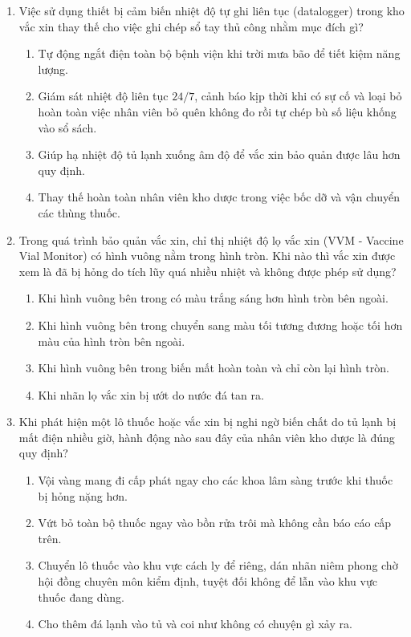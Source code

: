 \documentclass[12pt,a4paper]{article}
\begin{document}
\begin{enumerate}[label=\textbf{Câu \arabic*:}, leftmargin=*]
\item Việc sử dụng thiết bị cảm biến nhiệt độ tự ghi liên tục (datalogger) trong kho vắc xin thay thế cho việc ghi chép sổ tay thủ công nhằm mục đích gì?
\begin{enumerate}[label=\textbf{\Alph*.}]
    \item Tự động ngắt điện toàn bộ bệnh viện khi trời mưa bão để tiết kiệm năng lượng.
    \item Giám sát nhiệt độ liên tục $24/7$, cảnh báo kịp thời khi có sự cố và loại bỏ hoàn toàn việc nhân viên bỏ quên không đo rồi tự chép bù số liệu khống vào sổ sách.
    \item Giúp hạ nhiệt độ tủ lạnh xuống âm độ để vắc xin bảo quản được lâu hơn quy định.
    \item Thay thế hoàn toàn nhân viên kho dược trong việc bốc dỡ và vận chuyển các thùng thuốc.
\end{enumerate}

\item Trong quá trình bảo quản vắc xin, chỉ thị nhiệt độ lọ vắc xin (VVM - Vaccine Vial Monitor) có hình vuông nằm trong hình tròn. Khi nào thì vắc xin được xem là đã bị hỏng do tích lũy quá nhiều nhiệt và không được phép sử dụng?
\begin{enumerate}[label=\textbf{\Alph*.}]
    \item Khi hình vuông bên trong có màu trắng sáng hơn hình tròn bên ngoài.
    \item Khi hình vuông bên trong chuyển sang màu tối tương đương hoặc tối hơn màu của hình tròn bên ngoài.
    \item Khi hình vuông bên trong biến mất hoàn toàn và chỉ còn lại hình tròn.
    \item Khi nhãn lọ vắc xin bị ướt do nước đá tan ra.
\end{enumerate}

\item Khi phát hiện một lô thuốc hoặc vắc xin bị nghi ngờ biến chất do tủ lạnh bị mất điện nhiều giờ, hành động nào sau đây của nhân viên kho dược là đúng quy định?
\begin{enumerate}[label=\textbf{\Alph*.}]
    \item Vội vàng mang đi cấp phát ngay cho các khoa lâm sàng trước khi thuốc bị hỏng nặng hơn.
    \item Vứt bỏ toàn bộ thuốc ngay vào bồn rửa trôi mà không cần báo cáo cấp trên.
    \item Chuyển lô thuốc vào khu vực cách ly để riêng, dán nhãn niêm phong chờ hội đồng chuyên môn kiểm định, tuyệt đối không để lẫn vào khu vực thuốc đang dùng.
    \item Cho thêm đá lạnh vào tủ và coi như không có chuyện gì xảy ra.
\end{enumerate}


\end{enumerate}
\end{document}
